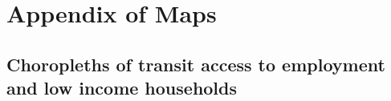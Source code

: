 \documentclass[11 pt, letterpaper]{article}
\begin{document}
{%

















\newpage





\newpage

\appendix
\section{Appendix of Maps}

\subsection{Choropleths of transit access to employment and low income households}



}
\end{document}
